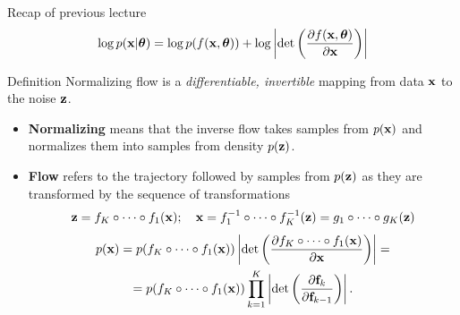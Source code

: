 \begin{frame}{Recap of previous lecture}
	\vspace{-0.3cm}
	\[
		\log p(\mathbf{x}|\boldsymbol{\theta}) = \log p(f(\mathbf{x}, \boldsymbol{\theta})) + \log \left|\det \left( \frac{\partial f(\mathbf{x}, \boldsymbol{\theta})}{\partial \mathbf{x}} \right) \right|
	\]
	\vspace{-0.3cm}
	\begin{block}{Definition}
		Normalizing flow is a \textit{differentiable, invertible} mapping from data $\mathbf{x}$ to the noise $\mathbf{z}$. 
	\end{block}
	\begin{itemize}
		\item \textbf{Normalizing} means that the inverse flow takes samples from $p(\mathbf{x})$ and normalizes them into samples from density $p(\mathbf{z})$.
		\item \textbf{Flow} refers to the trajectory followed by samples from $p(\mathbf{z})$ as they are transformed by the sequence of transformations
		\[
		\mathbf{z} = f_K \circ \dots \circ f_1(\mathbf{x}); \quad \mathbf{x} = f_1^{-1} \circ \dots \circ f_K^{-1} (\mathbf{z}) = g_1 \circ \dots \circ g_K(\mathbf{z}) 
		\] 
		\begin{multline*}
			p(\mathbf{x}) = p(f_K \circ \dots \circ f_1(\mathbf{x})) \left|\det \left(\frac{\partial f_K \circ \dots \circ f_1(\mathbf{x})}{\partial \mathbf{x}} \right) \right| = \\
			= p(f_K \circ \dots \circ f_1(\mathbf{x})) \prod_{k=1}^K \left|\det \left(\frac{\partial \mathbf{f}_k}{\partial \mathbf{f}_{k-1}} \right) \right|.
		\end{multline*}
	\end{itemize}
\end{frame}
